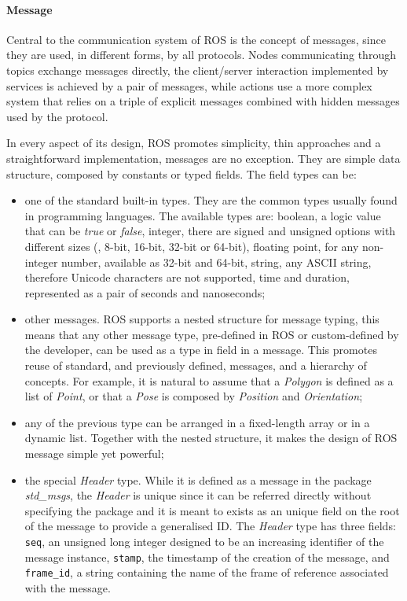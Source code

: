 \paragraph{Message} Central to the communication system of ROS is the concept of messages, since they are used, in different forms, by all protocols. Nodes communicating through topics exchange messages directly, the client/server interaction implemented by services is achieved by a pair of messages, while actions use a more complex system that relies on a triple of explicit messages combined with hidden messages used by the protocol.

In every aspect of its design, ROS promotes simplicity, thin approaches and a straightforward implementation, messages are no exception. They are simple data structure, composed by constants or typed fields. The field types can be:
\begin{itemize}
\item one of the standard built-in types. They are the common types usually found in programming languages. The available types are: boolean, a logic value that can be \textit{true} or \textit{false}, integer, there are signed and unsigned options with different sizes (\ie, 8-bit, 16-bit, 32-bit or 64-bit), floating point, for any non-integer number, available as 32-bit and 64-bit, string, any ASCII string, therefore Unicode characters are not supported, time and duration, represented as a pair of seconds and nanoseconds;
\item other messages. ROS supports a nested structure for message typing, this means that any other message type, pre-defined in ROS or custom-defined by the developer, can be used as a type in field in a message. This promotes reuse of standard, and previously defined, messages, and a hierarchy of concepts. For example, it is natural to assume that a \textit{Polygon} is defined as a list of \textit{Point}, or that a \textit{Pose} is composed by \textit{Position} and \textit{Orientation};
\item any of the previous type can be arranged in a fixed-length array or in a dynamic list. Together with the nested structure, it makes the design of ROS message simple yet powerful;
\item the special \textit{Header} type. While it is defined as a message in the package \textit{std\_msgs}, the \textit{Header} is unique since it can be referred directly without specifying the package and it is meant to exists as an unique field on the root of the message to provide a generalised ID. The \textit{Header} type has three fields: \texttt{seq}, an unsigned long integer designed to be an increasing identifier of the message instance, \texttt{stamp}, the timestamp of the creation of the message, and \texttt{frame\_id}, a string containing the name of the frame of reference associated with the message.
\end{itemize}

